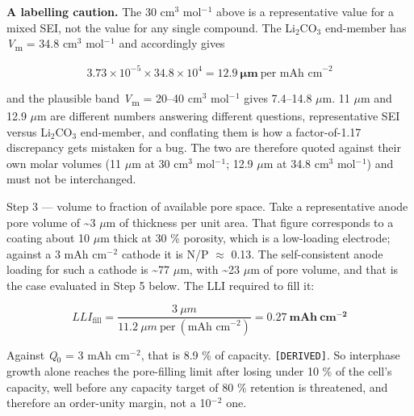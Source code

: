\documentclass[11pt,a4paper]{article}
\begin{document}
\textbf{A labelling caution.} The 30 cm\ensuremath{^{3}} mol\ensuremath{^{-}}\ensuremath{^{1}} above is a representative value for a mixed SEI, not the value for any single compound. The Li\ensuremath{_{2}}CO\ensuremath{_{3}} end-member has \emph{V}\textsubscript{m} = 34.8 cm\ensuremath{^{3}} mol\ensuremath{^{-}}\ensuremath{^{1}} and accordingly gives


\begin{equation}3.73\times10^{-5}\times34.8\times10^{4} = \mathbf{12.9\ \mu m}\ \text{per mAh cm}^{-2} \tag{S2.E8}\end{equation}


and the plausible band \emph{V}\textsubscript{m} = 20--40 cm\ensuremath{^{3}} mol\ensuremath{^{-}}\ensuremath{^{1}} gives 7.4--14.8 \ensuremath{\mu}m. 11 \ensuremath{\mu}m and 12.9 \ensuremath{\mu}m are different numbers answering different questions, representative SEI versus Li\ensuremath{_{2}}CO\ensuremath{_{3}} end-member, and conflating them is how a factor-of-1.17 discrepancy gets mistaken for a bug. The two are therefore quoted against their own molar volumes (11 \ensuremath{\mu}m at 30 cm\ensuremath{^{3}} mol\ensuremath{^{-}}\ensuremath{^{1}}; 12.9 \ensuremath{\mu}m at 34.8 cm\ensuremath{^{3}} mol\ensuremath{^{-}}\ensuremath{^{1}}) and must not be interchanged.


Step 3 --- volume to fraction of available pore space. Take a representative anode pore volume of \textasciitilde{}3 \ensuremath{\mu}m of thickness per unit area. That figure corresponds to a coating about 10 \ensuremath{\mu}m thick at 30 \% porosity, which is a low-loading electrode; against a 3 mAh cm\ensuremath{^{-}}\ensuremath{^{2}} cathode it is N/P \ensuremath{\approx} 0.13. The self-consistent anode loading for such a cathode is \textasciitilde{}77 \ensuremath{\mu}m, with \textasciitilde{}23 \ensuremath{\mu}m of pore volume, and that is the case evaluated in Step 5 below. The LLI required to fill it:


\begin{equation}LLI_{\text{fill}} = \frac{3\ \mu m}{11.2\ \mu m\ \text{per}\ (\text{mAh cm}^{-2})} = \mathbf{0.27\ mAh\ cm^{-2}} \tag{S2.E9}\end{equation}


Against \emph{Q}\ensuremath{_{0}} = 3 mAh cm\ensuremath{^{-}}\ensuremath{^{2}}, that is 8.9 \% of capacity. \texttt{[DERIVED]}. So interphase growth alone reaches the pore-filling limit after losing under 10 \% of the cell's capacity, well before any capacity target of 80 \% retention is threatened, and therefore an order-unity margin, not a 10\ensuremath{^{-}}\ensuremath{^{2}} one.
\end{document}
